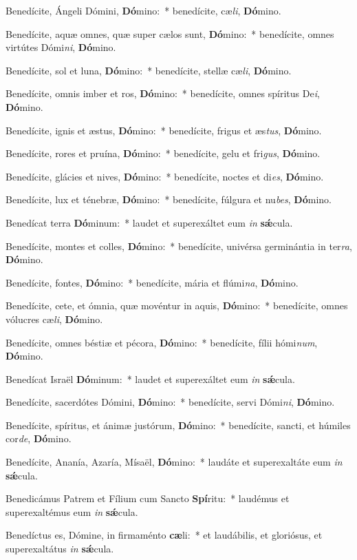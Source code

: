 \item Benedícite, Ángeli Dómini, \textbf{Dó}mino:~* benedícite, cæ\textit{li}, \textbf{Dó}mino.
\item Benedícite, aquæ omnes, quæ super cælos sunt, \textbf{Dó}mino:~* benedícite, omnes virtútes Dómi\textit{ni}, \textbf{Dó}mino.
\item Benedícite, sol et luna, \textbf{Dó}mino:~* benedícite, stellæ cæ\textit{li}, \textbf{Dó}mino.
\item Benedícite, omnis imber et ros, \textbf{Dó}mino:~* benedícite, omnes spíritus De\textit{i}, \textbf{Dó}mino.
\item Benedícite, ignis et æstus, \textbf{Dó}mino:~* benedícite, frigus et æs\textit{tus}, \textbf{Dó}mino.
\item Benedícite, rores et pruína, \textbf{Dó}mino:~* benedícite, gelu et fri\textit{gus}, \textbf{Dó}mino.
\item Benedícite, glácies et nives, \textbf{Dó}mino:~* benedícite, noctes et di\textit{es}, \textbf{Dó}mino.
\item Benedícite, lux et ténebræ, \textbf{Dó}mino:~* benedícite, fúlgura et nu\textit{bes}, \textbf{Dó}mino.
\item Benedícat terra \textbf{Dó}minum:~* laudet et superexáltet eum \textit{in} \textbf{sǽ}cula.
\item Benedícite, montes et colles, \textbf{Dó}mino:~* benedícite, univérsa germinántia in ter\textit{ra}, \textbf{Dó}mino.
\item Benedícite, fontes, \textbf{Dó}mino:~* benedícite, mária et flúmi\textit{na}, \textbf{Dó}mino.
\item Benedícite, cete, et ómnia, quæ movéntur in aquis, \textbf{Dó}mino:~* benedícite, omnes vólucres cæ\textit{li}, \textbf{Dó}mino.
\item Benedícite, omnes béstiæ et pécora, \textbf{Dó}mino:~* benedícite, fílii hómi\textit{num}, \textbf{Dó}mino.
\item Benedícat Israël \textbf{Dó}minum:~* laudet et superexáltet eum \textit{in} \textbf{sǽ}cula.
\item Benedícite, sacerdótes Dómini, \textbf{Dó}mino:~* benedícite, servi Dómi\textit{ni}, \textbf{Dó}mino.
\item Benedícite, spíritus, et ánimæ justórum, \textbf{Dó}mino:~* benedícite, sancti, et húmiles cor\textit{de}, \textbf{Dó}mino.
\item Benedícite, Ananía, Azaría, Mísaël, \textbf{Dó}mino:~* laudáte et superexaltáte eum \textit{in} \textbf{sǽ}cula.
\item Benedicámus Patrem et Fílium cum Sancto \textbf{Spí}ritu:~* laudémus et superexaltémus eum \textit{in} \textbf{sǽ}cula.
\item Benedíctus es, Dómine, in firmaménto \textbf{cæ}li:~* et laudábilis, et gloriósus, et superexaltátus \textit{in} \textbf{sǽ}cula.
